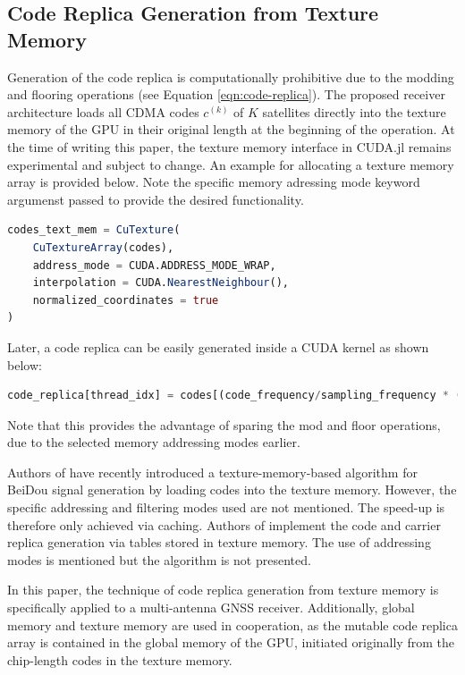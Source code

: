 \documentclass{juliacon}
\begin{document}
\subsection*{Code Replica Generation from Texture Memory}
Generation of the code replica is computationally prohibitive due to the modding and flooring operations (see Equation \ref{eqn:code-replica}). The proposed receiver architecture loads all CDMA codes $c^{(k)}$ of $K$ satellites directly into the texture memory of the GPU in their original length at the beginning of the operation. At the time of writing this paper, the texture memory interface in CUDA.jl remains experimental and subject to change. An example for allocating a texture memory array is provided below. Note the specific memory adressing mode keyword argumenst passed to provide the desired functionality.
\begin{lstlisting}[language = Julia]
codes_text_mem = CuTexture(
    CuTextureArray(codes),
    address_mode = CUDA.ADDRESS_MODE_WRAP,
    interpolation = CUDA.NearestNeighbour(),
    normalized_coordinates = true
)
\end{lstlisting}
Later, a code replica can be easily generated inside a CUDA kernel as shown below:\begin{lstlisting}[language = Julia]
code_replica[thread_idx] = codes[(code_frequency/sampling_frequency * (thread_idx + latest_shift) + start_code_phase) / code_length, prn)]
\end{lstlisting}
Note that this provides the advantage of sparing the mod and floor operations, due to the selected memory addressing modes earlier.

Authors of \cite{Shi2021} have recently introduced a texture-memory-based algorithm for BeiDou signal generation by loading codes into the texture memory. However, the specific addressing and filtering modes used are not mentioned. The speed-up is therefore only achieved via caching. Authors of \cite{Li2012} implement the code and carrier replica generation via tables stored in texture memory. The use of addressing modes is mentioned but the algorithm is not presented.

In this paper, the technique of code replica generation from texture memory is specifically applied to a multi-antenna GNSS receiver. Additionally, global memory and texture memory are used in cooperation, as the mutable code replica array is contained in the global memory of the GPU, initiated originally from the chip-length codes in the texture memory.
\end{document}
